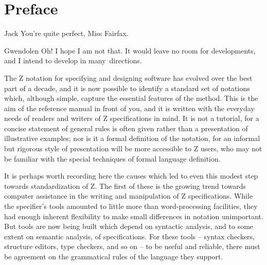 	\makeindex \makeglossary \makesymdex


\setcounter{page}{5} 		%
\tableofcontents		%

\clearpage\markboth{}{}\cleardoublepage
\chapter*{Preface}

\begin{thema}\begin{playlet}
\item[Jack] You're quite perfect, Miss Fairfax.
\item[Gwendolen] Oh! I hope I am not that. It would leave no room
	for developments, and I intend to develop in many~directions.
\end{playlet}\end{thema}

\noindent
The Z notation for specifying and designing software has evolved
over the best part of a decade, and it is now possible to identify
a standard set of notations which, although simple, capture the
essential features of the method. This is the aim of the reference
manual in front of you, and it is written with the everyday needs
of readers and writers of Z specifications in mind. It is not
a tutorial, for a concise statement of general rules
is often given rather than a presentation of illustrative examples;
nor is it a formal definition of the notation, for an informal
but rigorous style of presentation will be more accessible to
Z users, who may not be familiar with the special techniques of
formal language definition.

It is perhaps worth recording here the causes which led to even this
modest step towards standardization of Z. The first of these is the
growing trend towards computer assistance in the writing and
manipulation of Z specifications. While the specifier's tools
amounted to little more than word-processing facilities, they had
enough inherent flexibility to make small differences in notation
unimportant. But tools are now being built which depend on syntactic
analysis, and to some extent on semantic analysis, of specifications.
For these tools -- syntax checkers, structure editors, type checkers,
and so on -- to be useful and reliable, there must be agreement on
the grammatical rules of the language they support.

